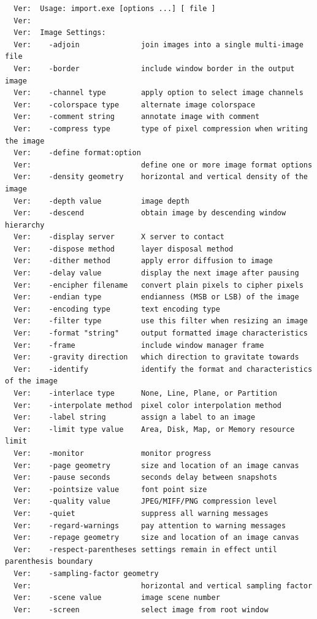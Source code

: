 \documentclass[11pt]{article}
\begin{document}
\begin{verbatim}
  Ver:  Usage: import.exe [options ...] [ file ]
  Ver:  
  Ver:  Image Settings:
  Ver:    -adjoin              join images into a single multi-image file
  Ver:    -border              include window border in the output image
  Ver:    -channel type        apply option to select image channels
  Ver:    -colorspace type     alternate image colorspace
  Ver:    -comment string      annotate image with comment
  Ver:    -compress type       type of pixel compression when writing the image
  Ver:    -define format:option
  Ver:                         define one or more image format options
  Ver:    -density geometry    horizontal and vertical density of the image
  Ver:    -depth value         image depth
  Ver:    -descend             obtain image by descending window hierarchy
  Ver:    -display server      X server to contact
  Ver:    -dispose method      layer disposal method
  Ver:    -dither method       apply error diffusion to image
  Ver:    -delay value         display the next image after pausing
  Ver:    -encipher filename   convert plain pixels to cipher pixels
  Ver:    -endian type         endianness (MSB or LSB) of the image
  Ver:    -encoding type       text encoding type
  Ver:    -filter type         use this filter when resizing an image
  Ver:    -format "string"     output formatted image characteristics
  Ver:    -frame               include window manager frame
  Ver:    -gravity direction   which direction to gravitate towards
  Ver:    -identify            identify the format and characteristics of the image
  Ver:    -interlace type      None, Line, Plane, or Partition
  Ver:    -interpolate method  pixel color interpolation method
  Ver:    -label string        assign a label to an image
  Ver:    -limit type value    Area, Disk, Map, or Memory resource limit
  Ver:    -monitor             monitor progress
  Ver:    -page geometry       size and location of an image canvas
  Ver:    -pause seconds       seconds delay between snapshots
  Ver:    -pointsize value     font point size
  Ver:    -quality value       JPEG/MIFF/PNG compression level
  Ver:    -quiet               suppress all warning messages
  Ver:    -regard-warnings     pay attention to warning messages
  Ver:    -repage geometry     size and location of an image canvas
  Ver:    -respect-parentheses settings remain in effect until parenthesis boundary
  Ver:    -sampling-factor geometry
  Ver:                         horizontal and vertical sampling factor
  Ver:    -scene value         image scene number
  Ver:    -screen              select image from root window

\end{verbatim}
\end{document}
